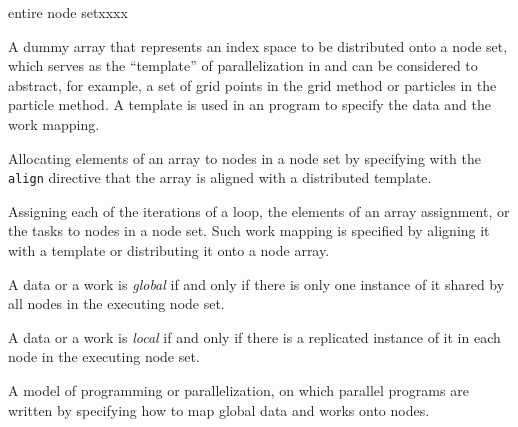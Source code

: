 \begin{namelist}{entire node setxxxx}

 A dummy array that represents an index space to be distributed onto a
 node set, which serves as the ``template'' of parallelization in
 {\XMP} and can be considered to abstract, for example, a set of grid
 points in the grid method or particles in the particle method.
%
 A template is used in an {\XMP} program to specify the data and the
 work mapping.



 Allocating elements of an array to nodes in a node set by specifying
 with the {\tt align} directive that the array is aligned with a
 distributed template.



 Assigning each of the iterations of a loop, the elements of an array
 assignment, or the tasks to nodes in a node set. Such work mapping is
 specified by aligning it with a template or distributing it onto a
 node array.

%


 A data or a work is {\it global} if and only if there is only one
 instance of it shared by all nodes in the executing node set.


 A data or a work is {\it local} if and only if there is a replicated
 instance of it in each node in the executing node set.


 A model of programming or parallelization, on which parallel programs
 are written by specifying how to map global data and works onto nodes.


\end{namelist}

